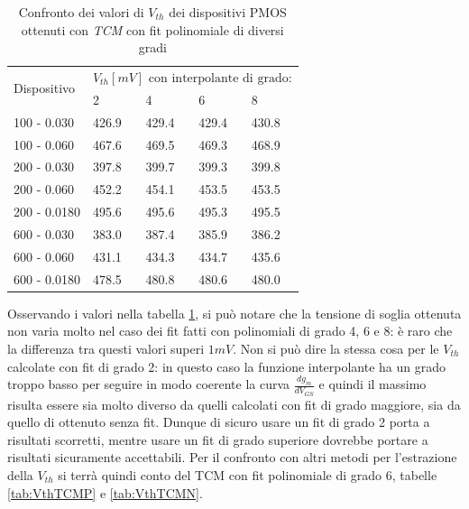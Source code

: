 \documentclass[12pt, letterpaper]{book}
\begin{document}
\begin{table}[h]
  \renewcommand{\arraystretch}{1.3}
  \centering
  \begin{tabular}{m{2.1cm} m{2cm} m{2cm} m{2cm} m{2cm}}
    \toprule
    \multirow{2}{*}{Dispositivo} & \multicolumn{4}{c}{$V_{th} [mV] \text{ con interpolante di grado:}$}                         \\
    \cmidrule{2-5}
                                 & 2                                                                    & 4     & 6     & 8     \\
    \midrule
    100 - 0.030                     & 426.9                                                                & 429.4 & 429.4 & 430.8 \\
    \hline
    100 - 0.060                     & 467.6                                                                & 469.5 & 469.3 & 468.9 \\
    \hline
    200 - 0.030                     & 397.8                                                                & 399.7 & 399.3 & 399.8 \\
    \hline
    200 - 0.060                     & 452.2                                                                & 454.1 & 453.5 & 453.5 \\
    \hline
    200 - 0.0180                    & 495.6                                                                & 495.6 & 495.3 & 495.5 \\
    \hline
    600 - 0.030                     & 383.0                                                                & 387.4 & 385.9 & 386.2 \\
    \hline
    600 - 0.060                     & 431.1                                                                & 434.3 & 434.7 & 435.6 \\
    \hline
    600 - 0.0180                    & 478.5                                                                & 480.8 & 480.6 & 480.0 \\

    \bottomrule
  \end{tabular}
  \caption{Confronto dei valori di $V_{th}$ dei dispositivi PMOS ottenuti con \emph{TCM} con fit polinomiale di diversi gradi}
  \label{tab:GradiTCM}
\end{table}

Osservando i valori nella tabella \ref{tab:GradiTCM}, si può notare che la tensione di soglia ottenuta non varia molto nel caso dei fit fatti con polinomiali di grado 4, 6 e 8: è raro che la differenza tra questi valori superi $1 mV$. Non si può dire la stessa cosa per le $V_{th}$ calcolate con fit di grado 2: in questo caso la funzione interpolante ha un grado troppo basso per seguire in modo coerente la curva $\frac{dg_m}{dV_{GS}}$ e quindi il massimo risulta essere sia molto diverso da quelli calcolati con fit di grado maggiore, sia da quello di ottenuto senza fit. Dunque di sicuro usare un fit di grado 2 porta a risultati scorretti, mentre usare un fit di grado superiore dovrebbe portare a risultati sicuramente accettabili. Per il confronto con altri metodi per l'estrazione della $V_{th}$ si terrà quindi conto del TCM con fit polinomiale di grado 6, tabelle \ref{tab:VthTCMP} e \ref{tab:VthTCMN}.
\end{document}
